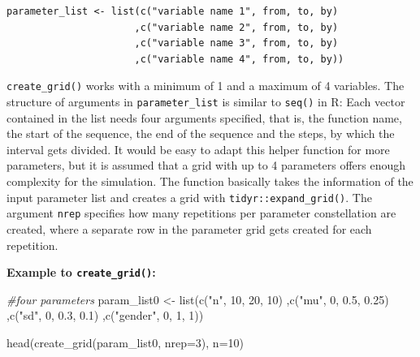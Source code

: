 \documentclass[11pt,a4paper]{article}
\newenvironment{Shaded}{\begin{snugshade}}{\end{snugshade}}
\newcommand{\AttributeTok}[1]{\textcolor[rgb]{0.77,0.63,0.00}{#1}}
\newcommand{\CommentTok}[1]{\textcolor[rgb]{0.56,0.35,0.01}{\textit{#1}}}
\newcommand{\DecValTok}[1]{\textcolor[rgb]{0.00,0.00,0.81}{#1}}
\newcommand{\FloatTok}[1]{\textcolor[rgb]{0.00,0.00,0.81}{#1}}
\newcommand{\FunctionTok}[1]{\textcolor[rgb]{0.00,0.00,0.00}{#1}}
\newcommand{\NormalTok}[1]{#1}
\newcommand{\OtherTok}[1]{\textcolor[rgb]{0.56,0.35,0.01}{#1}}
\newcommand{\StringTok}[1]{\textcolor[rgb]{0.31,0.60,0.02}{#1}}
\begin{document}
\begin{verbatim}
parameter_list <- list(c("variable name 1", from, to, by) 
                      ,c("variable name 2", from, to, by)
                      ,c("variable name 3", from, to, by)
                      ,c("variable name 4", from, to, by))
\end{verbatim}

\texttt{create\_grid()} works with a minimum of 1 and a maximum of 4
variables. The structure of arguments in \texttt{parameter\_list} is
similar to \texttt{seq()} in R: Each vector contained in the list needs
four arguments specified, that is, the function name, the start of the
sequence, the end of the sequence and the steps, by which the interval
gets divided. It would be easy to adapt this helper function for more
parameters, but it is assumed that a grid with up to 4 parameters offers
enough complexity for the simulation. The function basically takes the
information of the input parameter list and creates a grid with
\texttt{tidyr::expand\_grid()}. The argument \texttt{nrep} specifies how
many repetitions per parameter constellation are created, where a
separate row in the parameter grid gets created for each repetition.

\textbf{Example to \texttt{create\_grid()}:}

\begin{Shaded}
\begin{Highlighting}[]
\CommentTok{\#four parameters }
\NormalTok{param\_list0 }\OtherTok{\textless{}{-}} \FunctionTok{list}\NormalTok{(}\FunctionTok{c}\NormalTok{(}\StringTok{"n"}\NormalTok{, }\DecValTok{10}\NormalTok{, }\DecValTok{20}\NormalTok{, }\DecValTok{10}\NormalTok{)}
\NormalTok{                    ,}\FunctionTok{c}\NormalTok{(}\StringTok{"mu"}\NormalTok{, }\DecValTok{0}\NormalTok{, }\FloatTok{0.5}\NormalTok{, }\FloatTok{0.25}\NormalTok{)}
\NormalTok{                    ,}\FunctionTok{c}\NormalTok{(}\StringTok{"sd"}\NormalTok{, }\DecValTok{0}\NormalTok{, }\FloatTok{0.3}\NormalTok{, }\FloatTok{0.1}\NormalTok{)}
\NormalTok{                    ,}\FunctionTok{c}\NormalTok{(}\StringTok{"gender"}\NormalTok{, }\DecValTok{0}\NormalTok{, }\DecValTok{1}\NormalTok{, }\DecValTok{1}\NormalTok{))}

\FunctionTok{head}\NormalTok{(}\FunctionTok{create\_grid}\NormalTok{(param\_list0, }\AttributeTok{nrep=}\DecValTok{3}\NormalTok{), }\AttributeTok{n=}\DecValTok{10}\NormalTok{)}
\end{Highlighting}
\end{Shaded}
\end{document}
